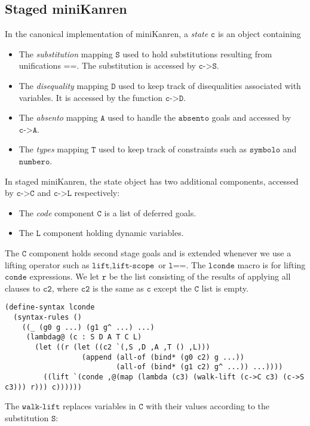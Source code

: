 \documentclass[11pt]{article}
\theoremstyle{definition}
\newcommand{\code}[1]{\texttt{#1}}
\newcommand\tab[1][1cm]{\hspace*{#1}}
\begin{document}
\subsection{Staged miniKanren}
In the canonical implementation of miniKanren, a \textit{state} $\code{c}$ is an object containing \begin{itemize}
    \item The \textit{substitution} mapping $\code{S}$ used to hold substitutions resulting from unifications $\code{==}$. The substitution is accessed by $\code{c->S}$.
    \item The \textit{disequality} mapping $\code{D}$ used to keep track of disequalities associated with variables. It is accessed by the function $\code{c->D}$. 
    \item The \textit{absento} mapping $\code{A}$ used to handle the $\code{absento}$ goals and accessed by $\code{c->A}$. 
    \item The \textit{types} mapping $\code{T}$ used to keep track of constraints such as $\code{symbolo}$ and $\code{numbero}$. 
\end{itemize} 
In staged miniKanren, the state object has two additional components, accessed by $\code{c->C}$ and $\code{c->L}$ respectively:
\begin{itemize}
    \item The \textit{code} component $\code{C}$ is a list of deferred goals. 
    \item The $\code{L}$ component holding dynamic variables.
\end{itemize}
The $\code{C}$ component holds second stage goals and is extended whenever we use a lifting operator such as $\code{lift}, \code{lift-scope}$ or $\code{l==}$. \newline 
\tab The $\code{lconde}$ macro is for lifting $\code{conde}$ expressions. We let $\code{r}$ be the list consisting of the results of applying all clauses to $\code{c2}$, where $\code{c2}$ is the same as $\code{c}$ except the $\code{C}$ list is empty.
\begin{lstlisting}
(define-syntax lconde
  (syntax-rules ()
    ((_ (g0 g ...) (g1 g^ ...) ...)
     (lambdag@ (c : S D A T C L)
       (let ((r (let ((c2 `(,S ,D ,A ,T () ,L)))
                  (append (all-of (bind* (g0 c2) g ...))
                          (all-of (bind* (g1 c2) g^ ...)) ...))))
         ((lift `(conde ,@(map (lambda (c3) (walk-lift (c->C c3) (c->S c3))) r))) c))))))
\end{lstlisting}
The $\code{walk-lift}$ replaces variables in $\code{C}$ with their values according to the substitution $\code{S}$:
\end{document}
